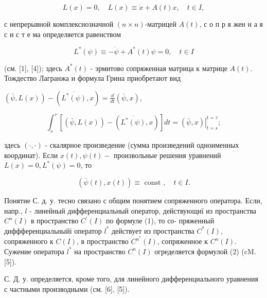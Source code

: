 \documentclass[10pt]{article}
\begin{document}
\[

L(x)=0, \quad L(x) \equiv \dot{x}+A(t) x, \quad t \in I,

\]



с непрерывной комплекснозначной $(n \times n)$-матрицей $A(t)$, с о п р я жен н а я с и с т е ма определяется равенством



\[

L^{*}(\psi) \equiv-\dot{\psi}+A^{*}(t) \psi=0, \quad t \in I

\]



(см. [1], [4]); здесь $A^{*}(t)$ - эрмитово сопряженная матрица к матрице $A(t)$. Тождество Лагранжа и формула Грина приобретают вид



$(\bar{\psi}, L(x))-\left(\overline{L^{*}(\psi)}, x\right)=\frac{d}{d t}(\bar{\psi}, x)$,



\[

\int_{s}^{\tau}\left[(\bar{\psi}, L(x))-\left(\overline{L^{*}(\psi)}, x\right)\right] d t=\left.(\bar{\psi}, x)\right|_{t=s} ^{t=\tau} ;

\]



здесь $(\cdot, \cdot)$ - скалярное произведение (сумма произведений одноименных координат). Если $x(t), \psi(t)-$ произвольные решения уравнений $L(x)=0, L^{*}(\psi)=0$, то



\[

(\bar{\psi}(t), x(t)) \equiv \text { const }, \quad t \in I .

\]



Понятие С. д. у. тесно связано с общим понятием сопряженного оператора. Если, напр., $l$ - линейный дифференциальный оператор, действующиї из пространства $C^{n}(I)$ в пространство $C^{\prime}(I)$ по формуле (1), то со- пряженный диффференциальныйі оператор $l^{*}$ действует из пространства $C^{*}(I)$, сопряженного к $C(I)$, в пространство $C^{n^{*}}(I)$, сопряженное к $C^{n}(I)$. Сужение оператора $l^{*}$ на пространство $C^{n}(I)$ огределяется формулой (2) (cM. [5]).



С. Д. у. определяется, кроме того, для линейного дифференциального уравнения с частными производными (см. [6], [5]).
\end{document}
